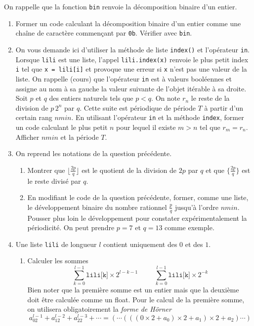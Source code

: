 On rappelle que la fonction \texttt{bin} renvoie la décomposition binaire d'un entier.
\begin{enumerate}
  \item Former un code calculant la décomposition binaire d'un entier comme une chaîne de caractère commençant par \texttt{0b}. Vérifier avec \texttt{bin}.
  
  \item On vous demande ici d'utiliser la  méthode de liste \texttt{index()} et l'opérateur \texttt{in}.\newline
  Lorsque \texttt{lili} est une liste, l'appel \texttt{lili.index(x)} renvoie le plus petit index \texttt{i} tel que \texttt{x = lili[i]} et provoque une erreur si \texttt{x} n'est pas une valeur de la liste.\newline
  On rappelle (cours) que l'opérateur \texttt{in} est à valeurs booléennes et assigne au nom à sa gauche la valeur suivante de l'objet itérable à sa droite.\newline
  Soit $p$ et $q$ des entiers naturels tels que $p < q$. On note $r_n$ le reste de la division de $p\,2^n$ par $q$. Cette suite est périodique de période $T$ à partir d'un certain rang $nmin$.\newline
  En utilisant l'opérateur \texttt{in} et la méthode \texttt{index}, former un code calculant le plus petit $n$ pour lequel il existe $m>n$ tel que $r_m = r_n$. Afficher $nmin$ et la période $T$.
  
  \item On reprend les notations de la question précédente.\label{dev_bin}
\begin{enumerate}
  \item Montrer que $\lfloor \frac{2p}{q} \rfloor$ est le quotient de la division de $2p$ par $q$ et que $\{ \frac{2p}{q} \}$ est le reste divisé par $q$. 
  \item En modifiant le code de la question précédente, former, comme une liste, le développement binaire du nombre rationnel $\frac{p}{q}$ jusqu'à l'ordre $nmin$. Pousser plus loin le développement pour constater expérimentalement la périodicité. On peut prendre $p=7$ et $q=13$ comme exemple.
\end{enumerate}

  \item Une liste \texttt{lili} de longueur $l$ contient uniquement des $0$ et des $1$.
\begin{enumerate}
  \item   Calculer les sommes
  \begin{displaymath}
   \sum_{k=0}^{l-1}\texttt{lili[k]} \times 2^{l-k-1}\hspace{1cm}
   \sum_{k=0}^{l-1}\texttt{lili[k]} \times 2^{-k}
  \end{displaymath}
Bien noter que la première somme est un entier mais que la deuxième doit être calculée comme un float. Pour le calcul de la première somme, on utilisera obligatoirement la \emph{forme de Hörner}
\begin{displaymath}
  a_02^{l-1}+a_12^{l-2}+a_22^{l-3}+ \cdots = 
\left( \cdots \left( \left( (0\times 2 + a_0) \times 2 + a_1\right) \times 2 + a_2\right) \cdots \right) 
\end{displaymath}


\end{enumerate}
\end{enumerate}
